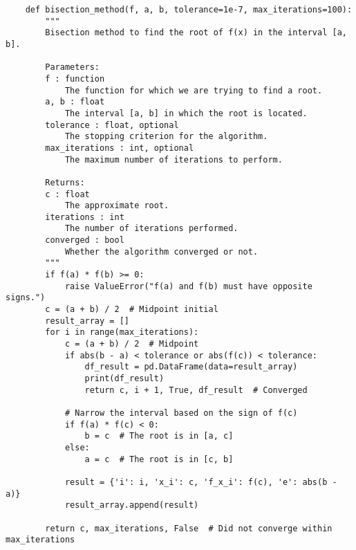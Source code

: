 \documentclass{article}
\begin{document}
    \begin{verbatim}
    def bisection_method(f, a, b, tolerance=1e-7, max_iterations=100):
        """
        Bisection method to find the root of f(x) in the interval [a, b].

        Parameters:
        f : function
            The function for which we are trying to find a root.
        a, b : float
            The interval [a, b] in which the root is located.
        tolerance : float, optional
            The stopping criterion for the algorithm.
        max_iterations : int, optional
            The maximum number of iterations to perform.

        Returns:
        c : float
            The approximate root.
        iterations : int
            The number of iterations performed.
        converged : bool
            Whether the algorithm converged or not.
        """
        if f(a) * f(b) >= 0:
            raise ValueError("f(a) and f(b) must have opposite signs.")
        c = (a + b) / 2  # Midpoint initial
        result_array = []
        for i in range(max_iterations):
            c = (a + b) / 2  # Midpoint
            if abs(b - a) < tolerance or abs(f(c)) < tolerance:
                df_result = pd.DataFrame(data=result_array)
                print(df_result)
                return c, i + 1, True, df_result  # Converged

            # Narrow the interval based on the sign of f(c)
            if f(a) * f(c) < 0:
                b = c  # The root is in [a, c]
            else:
                a = c  # The root is in [c, b]

            result = {'i': i, 'x_i': c, 'f_x_i': f(c), 'e': abs(b - a)}
            result_array.append(result)

        return c, max_iterations, False  # Did not converge within max_iterations

    \end{verbatim}
\end{document}
